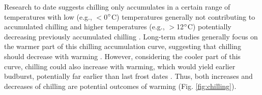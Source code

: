 \documentclass[11pt,letter]{article}
\begin{document}
Research to date suggests chilling only accumulates in a certain range of temperatures with low (e.g., $<$0$\degree$C) temperatures generally not contributing to accumulated chilling and higher temperatures (e.g., $>$12$\degree$C) potentially decreasing previously accumulated chilling \citep[see Fig. \ref{fig:chilling} and][]{richardson1974,fishman1987}. Long-term studies generally focus on the warmer part of this chilling accumulation curve, suggesting that chilling should decrease with warming \citep{fu2015,piao2017,gauzere2019}.  However, considering the cooler part of this curve, chilling could also increase with warming, which would yield earlier budburst, potentially far earlier than last frost dates \citep[][]{guy2014}. Thus, both increases and decreases of chilling are potential outcomes of warming (Fig. \ref{fig:chilling}).\\ 

\end{document}
